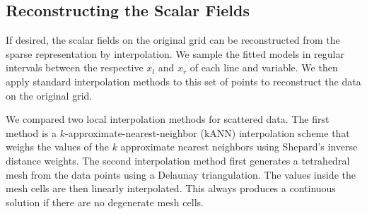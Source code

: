 
\subsection{Reconstructing the Scalar Fields} %
\label{sec:reconstruction}
%
If desired, the scalar fields on the original grid can be reconstructed from the
sparse representation by interpolation. We sample the fitted models in regular
intervals between the respective $x_l$ and $x_r$ of each line and variable. We
then apply standard interpolation methods to this set of points to reconstruct
the data on the original grid.

%

We compared two local interpolation methods for scattered data. The first method
is a $k$-approximate-nearest-neighbor (kANN) \cite{Arya1998} interpolation
scheme that weighs the values of the $k$ approximate nearest neighbors using
Shepard's inverse distance weights. 
%
%
%
The second interpolation method first generates a tetrahedral mesh from the data
points using a Delaunay triangulation. The values inside the mesh cells are then
linearly interpolated. This always produces a continuous solution if there are
no degenerate mesh cells.


